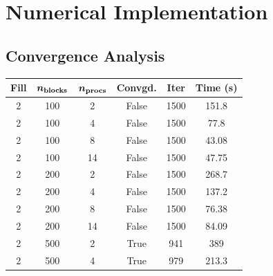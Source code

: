 \chapter{Numerical Implementation}

\section{Convergence Analysis}
\begin{table}[H]
	\tiny
  \begin{minipage}{0.48\textwidth}
	\centering
	\begin{tabular}{cccccc}
		\toprule
		\textbf{Fill} & \textbf{$\bm {n_{\rm blocks}}$} & \textbf{$\bm {\bm{n_{\rm procs}}}$} & \textbf{Convgd.} & \textbf{Iter} & \textbf{Time (s)} \\
		\midrule
		2             & 100                             & 2                              & False            & 1500          & 151.8             \\
		2             & 100                             & 4                              & False            & 1500          & 77.8              \\
		2             & 100                             & 8                              & False            & 1500          & 43.08             \\
		2             & 100                             & 14                             & False            & 1500          & 47.75             \\
		2             & 200                             & 2                              & False            & 1500          & 268.7             \\
		2             & 200                             & 4                              & False            & 1500          & 137.2             \\
		2             & 200                             & 8                              & False            & 1500          & 76.38             \\
		2             & 200                             & 14                             & False            & 1500          & 84.09             \\
		2             & 500                             & 2                              & True             & 941           & 389               \\
		2             & 500                             & 4                              & True             & 979           & 213.3             \\

\end{tabular}
\end{minipage}
\end{table}
